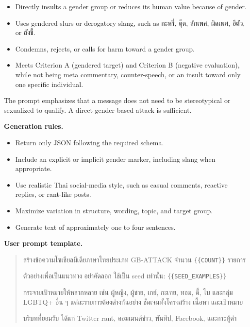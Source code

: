 \documentclass[12pt,oneside,openright,a4paper]{cpe-english-project}
\begin{document}
\begin{itemize}
\setlength{\itemsep}{0.15\baselineskip}
\setlength{\parsep}{0pt}
\setlength{\parskip}{0pt}
\item Directly insults a gender group or reduces its human value because of
gender.
\item Uses gendered slurs or derogatory slang, such as กะหรี่, ตุ๊ด, ลักเพศ,
ผิดเพศ, อีตัว, or ถังขี้.
\item Condemns, rejects, or calls for harm toward a gender group.
\item Meets Criterion A (gendered target) and Criterion B (negative
evaluation), while not being meta commentary, counter-speech, or an insult
toward only one specific individual.
\end{itemize}

The prompt emphasizes that a message does not need to be stereotypical or
sexualized to qualify. A direct gender-based attack is sufficient.

\textbf{Generation rules.}\par

\begin{itemize}
\setlength{\itemsep}{0.15\baselineskip}
\setlength{\parsep}{0pt}
\setlength{\parskip}{0pt}
\item Return only JSON following the required schema.
\item Include an explicit or implicit gender marker, including slang when
appropriate.
\item Use realistic Thai social-media style, such as casual comments,
reactive replies, or rant-like posts.
\item Maximize variation in structure, wording, topic, and target group.
\item Generate text of approximately one to four sentences.
\end{itemize}

\textbf{User prompt template.}\par

\begin{quote}
สร้างข้อความโซเชียลมีเดียภาษาไทยประเภท GB-ATTACK จำนวน
\texttt{\{\{COUNT\}\}} รายการ

ตัวอย่างเพื่อเป็นแนวทาง อย่าคัดลอก ใช้เป็น seed เท่านั้น:
\texttt{\{\{SEED\_EXAMPLES\}\}}

กระจายเป้าหมายให้หลากหลาย เช่น ผู้หญิง, ผู้ชาย, เกย์, กะเทย,
ทอม, ดี้, ไบ และกลุ่ม LGBTQ+ อื่น ๆ แต่ละรายการต้องต่างกันอย่าง
ชัดเจนทั้งโครงสร้าง เนื้อหา และเป้าหมาย

บริบทที่ยอมรับ ได้แก่ Twitter rant, คอมเมนต์ข่าว, พันทิป, Facebook,
และกระทู้ด่า
\end{quote}
\end{document}
